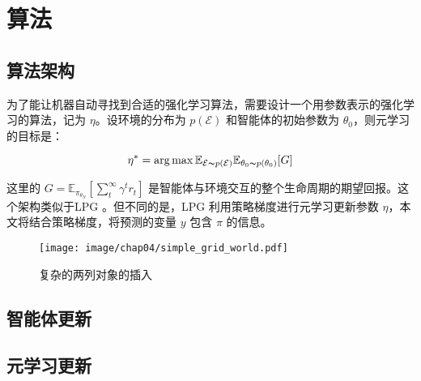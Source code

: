 \chapter{算法}
\label{cha:usage-example}

\section{算法架构}
为了能让机器自动寻找到合适的强化学习算法，需要设计一个用参数表示的强化学习的算法，记为 $\eta$。设环境的分布为 $p(\mathcal{E})$ 和智能体的初始参数为 $\theta_0$，则元学习的目标是：

\begin{equation}
    \eta^* = \arg \max \mathbb{E}_{\mathcal{E} \thicksim p(\mathcal{E})} \mathbb{E}_{\theta_0 \thicksim p(\theta_0)} [G]
\end{equation}

这里的 $G=\mathbb{E}_{\pi_{\theta_N} } [\sum_t^\infty \gamma^t r_t]$ 是智能体与环境交互的整个生命周期的期望回报。这个架构类似于LPG \cite{ohDiscoveringReinforcementLearning2020}。但不同的是，LPG 利用策略梯度进行元学习更新参数 $\eta$，本文将结合策略梯度，将预测的变量 $y$ 包含 $\pi$ 的信息。

\begin{figure}[h!] %
    \centering
    \texttt{[image: image/chap04/simple\_grid\_world.pdf]}
    \label{fig:compare1}
    \caption{复杂的两列对象的插入}
    \label{fig:complex}
\end{figure}





\section{智能体更新}




\section{元学习更新}

